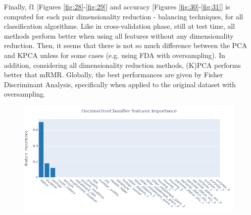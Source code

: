 \documentclass[letterpaper]{article}
\begin{document}
	\newpage Finally, f1 [Figures \ref{fig:28}-\ref{fig:29}] and accuracy [Figures \ref{fig:30}-\ref{fig:31}] is computed for each pair dimensionality reduction - balancing techniques, for all classification algorithms. Like in cross-validation phase, still at test time, all methods perform better when using all features without any dimensionality reduction. Then, it seems that there is not so much difference between the PCA and KPCA unless for some cases (e.g. using FDA with oversampling). In addition, considering all dimensionality reduction methods, (K)PCA performs better that mRMR. Globally, the best performances are given by Fisher Discriminant Analysis, specifically when applied to the original dataset with oversampling.
	\begin{figure}[!h]
		\centering
		\includegraphics[width=.9\textwidth]{images/DecisionTreeClassifier_features_importance.png}
		\setlength{\abovecaptionskip}{-5pt}
		\label{fig:32}
	\end{figure}
\end{document}
